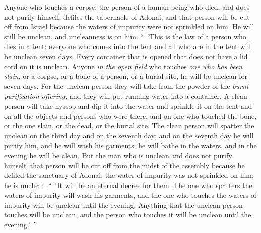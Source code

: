 \begin{biblechapter}
\verse Anyone who touches a corpse, the person of a human being who died, and does not purify himself, defiles the tabernacle of Adonai, and that person will be cut off from Israel because the waters of impurity were not sprinkled on him. He will still be unclean, and uncleanness is on him.
\verse “ ‘This is the law of a person who dies in a tent: everyone who comes into the tent and all who are in the tent will be unclean seven days.
\verse Every container that is opened that does not have a lid cord on it is unclean.
\verse Anyone \textit{in the open field} who touches \textit{one who has been slain}, or a corpse, or a bone of a person, or a burial site, he will be unclean for seven days.
\verse For the unclean person they will take from the powder of the \textit{burnt purification offering}, and they will put running water into a container.
\verse A clean person will take hyssop and dip it into the water and sprinkle it on the tent and on all the objects and persons who were there, and on one who touched the bone, or the one slain, or the dead, or the burial site.
\verse The clean person will spatter the unclean on the third day and on the seventh day; and on the seventh day he will purify him, and he will wash his garments; he will bathe in the waters, and in the evening he will be clean.
\verse But the man who is unclean and does not purify himself, that person will be cut off from the midst of the assembly because he defiled the sanctuary of Adonai; the water of impurity was not sprinkled on him; he is unclean.
\verse “ ‘It will be an eternal decree for them. The one who spatters the waters of impurity will wash his garments, and the one who touches the waters of impurity will be unclean until the evening.
\verse Anything that the unclean person touches will be unclean, and the person who touches it will be unclean until the evening.’ ”
\end{biblechapter}

